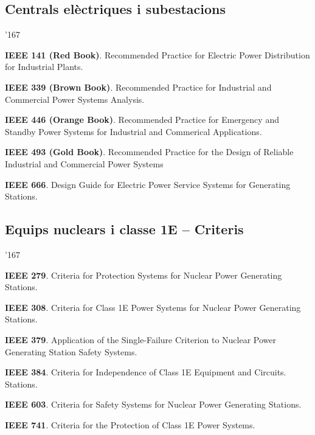 \subsection*{Centrals el\`{e}ctriques i subestacions}
\begin{dinglist}{'167}
    \item \textbf{IEEE 141 (Red Book)}. Recommended Practice for Electric Power Distribution for Industrial Plants.
    \item \textbf{IEEE 339 (Brown Book)}. Recommended Practice for Industrial and Commercial Power Systems Analysis.
    \item \textbf{IEEE 446 (Orange Book)}. Recommended Practice for Emergency and Standby Power Systems for Industrial and Commerical Applications.
    \item \textbf{IEEE 493 (Gold Book)}. Recommended Practice for the Design of Reliable Industrial and Commercial Power Systems 
    \item \textbf{IEEE 666}. Design Guide for Electric Power Service Systems for Generating Stations.
\end{dinglist}


\subsection*{Equips nuclears i classe 1E -- Criteris} 
\begin{dinglist}{'167}
    \item \textbf{IEEE 279}. Criteria for Protection Systems for Nuclear Power Generating Stations.
    \item \textbf{IEEE 308}. Criteria for Class 1E Power Systems for Nuclear Power Generating Stations.
    \item \textbf{IEEE 379}. Application of the Single-Failure Criterion to Nuclear Power Generating Station Safety Systems.
    \item \textbf{IEEE 384}. Criteria for Independence of Class 1E Equipment and Circuits.
        Stations.
    \item \textbf{IEEE 603}. Criteria for Safety Systems for Nuclear Power Generating Stations.
    \item \textbf{IEEE 741}. Criteria for the Protection of Class 1E Power Systems.
\end{dinglist}


